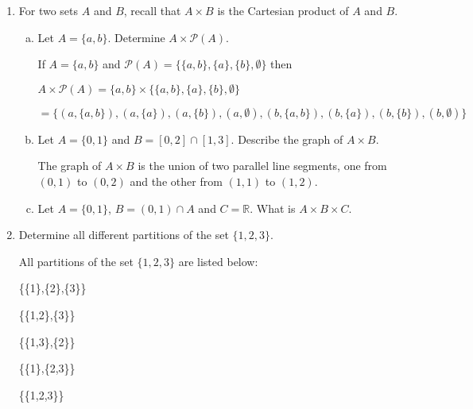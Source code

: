 \documentclass[10pt]{article} %
\newcommand{\cP}{\mathcal{P}}
\newcommand{\R}{\mathbb{R}}
\begin{document}
\begin{enumerate}
\bigskip

\item For two sets $A$ and $B$, recall that $A \times B$ is the
  Cartesian product of $A$ and $B$.
  \begin{enumerate}[(a)]
  \item Let $A=\{a, b\}$. Determine $A\times \cP(A)$.
  \bigskip
  
    If $A = \{a,b\}$ and $\cP(A) = \{\{a,b\},\{a\},\{b\},\emptyset\}$ then \begin{center} $A\times \cP(A) = \{a,b\} \times \{\{a,b\},\{a\},\{b\},\emptyset\}$ \end{center}
  \begin{center} $= \{(a,\{a,b\}),(a,\{a\}),(a,\{b\}),(a,\emptyset),(b,\{a,b\}),(b,\{a\}),(b,\{b\}),(b,\emptyset)\}$  \end{center}
  
  \bigskip
  
  \item Let $A = \{0,1\}$ and $B = [0,2] \cap [1,3]$. Describe the graph
    of $A \times B$.
  \bigskip
  
    The graph of $A \times B$ is the union of two parallel line segments, one from $(0,1)$ to $(0,2)$ and the other from $(1,1)$ to $(1,2)$.  
  
  \bigskip
  
  \item Let $A = \{0,1\}$, $B = (0,1) \cap A$ and $C = \R$. What is $A
    \times B \times C$.
  \end{enumerate}


\item Determine all different partitions of the set $\{1,2,3\}$.
\bigskip

  All partitions of the set $\{1,2,3\}$ are listed below:
\begin{center}\{\{1\},\{2\},\{3\}\}\end{center}
\begin{center}\{\{1,2\},\{3\}\}\end{center}
\begin{center}\{\{1,3\},\{2\}\}\end{center}
\begin{center}\{\{1\},\{2,3\}\}\end{center}
\begin{center}\{\{1,2,3\}\}\end{center}

\bigskip




\end{enumerate}
\end{document}
